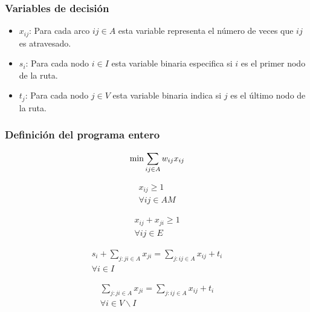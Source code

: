 \documentclass[spanish, conference]{IEEEtran}
\begin{document}
\subsubsection{Variables de decisión}
\begin{itemize}
\item $x_{i j}$: Para cada arco $ {i j} \in A$ esta variable representa el número de veces que $i j$ es atravesado.

\item $s_i$: Para cada nodo $i \in I$ esta variable binaria especifica si  $i$ es el primer nodo de la ruta.

\item $t_j$: Para cada nodo $j \in V$ esta variable binaria indica si $j$ es el último nodo de la ruta.
\end{itemize}

\subsubsection{Definición del programa entero}
\label{sec:programa-entero}
\begin{equation*}
\min \sum_{i j \in A} w_{i j} x_{i j}  \\
\end{equation*} 
\hbox{}

\begin{equation} \tag{1} \label{eq1}
\begin{gathered}
x_{i j} \geq 1 \\
\forall i j \in A M
\end{gathered}
\end{equation} 
\hbox{}

\begin{equation} \tag{2} \label{eq2}
\begin{gathered}
x_{i j} + x_{j i} \geq 1 \\
\forall i j \in E
\end{gathered}
\end{equation}
\hbox{}

\begin{equation} \tag{3a} \label{eq3a}
\begin{gathered}
s_i + \sum_{j: j i \in A} x_{j i} = \sum_{j: i j \in A} x_{i j} + t_i \\
\forall i \in I
\end{gathered}
\end{equation} 
\hbox{}

\begin{equation} \tag{3b} \label{eq3b}
\begin{gathered}
\sum_{j: j i \in A} x_{j i} = \sum_{j: i j \in A} x_{i j} + t_i \\
\forall i \in V\backslash I
\end{gathered}
\end{equation}
\hbox{}
\end{document}
